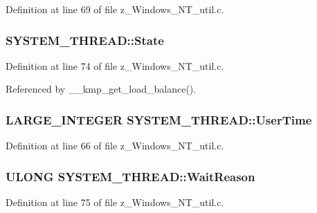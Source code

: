 Definition at line 69 of file z\-\_\-\-Windows\-\_\-\-N\-T\-\_\-util.\-c.

\hypertarget{structSYSTEM__THREAD_ac2999f6615545dd16388e7d60280a456}{
\subsubsection[{State}]{ S\-Y\-S\-T\-E\-M\-\_\-\-T\-H\-R\-E\-A\-D\-::\-State}}\label{structSYSTEM__THREAD_ac2999f6615545dd16388e7d60280a456}


Definition at line 74 of file z\-\_\-\-Windows\-\_\-\-N\-T\-\_\-util.\-c.



Referenced by \-\_\-\-\_\-kmp\-\_\-get\-\_\-load\-\_\-balance().

\hypertarget{structSYSTEM__THREAD_a184e75552dfdee4dff101e7157fd490e}{
\subsubsection[{User\-Time}]{\setlength{\rightskip}{0pt plus 5cm}L\-A\-R\-G\-E\-\_\-\-I\-N\-T\-E\-G\-E\-R S\-Y\-S\-T\-E\-M\-\_\-\-T\-H\-R\-E\-A\-D\-::\-User\-Time}}\label{structSYSTEM__THREAD_a184e75552dfdee4dff101e7157fd490e}


Definition at line 66 of file z\-\_\-\-Windows\-\_\-\-N\-T\-\_\-util.\-c.

\hypertarget{structSYSTEM__THREAD_aa4017ed1b6684d56d00778f09696b1f4}{
\subsubsection[{Wait\-Reason}]{\setlength{\rightskip}{0pt plus 5cm}U\-L\-O\-N\-G S\-Y\-S\-T\-E\-M\-\_\-\-T\-H\-R\-E\-A\-D\-::\-Wait\-Reason}}\label{structSYSTEM__THREAD_aa4017ed1b6684d56d00778f09696b1f4}


Definition at line 75 of file z\-\_\-\-Windows\-\_\-\-N\-T\-\_\-util.\-c.

